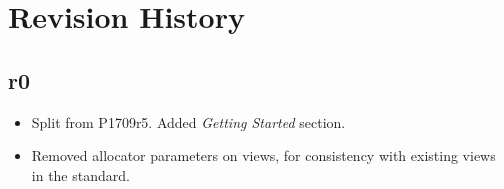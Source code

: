 \section{Revision History}

\subsection*{\paperno r0}

\begin{itemize}
      \item Split from P1709r5. Added \textit{Getting Started} section.
      \item Removed allocator parameters on views, for consistency with existing views in the standard. 
\end{itemize}
